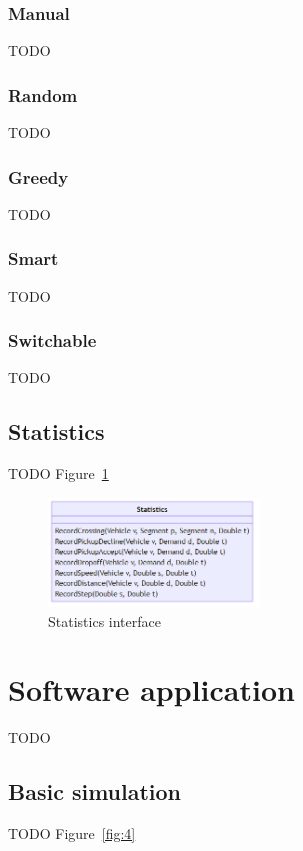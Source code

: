 \documentclass{article}
\begin{document}
    \subsubsection{Manual}
    TODO

    \subsubsection{Random}
    TODO
    
    \subsubsection{Greedy}
    TODO

    \subsubsection{Smart}
    TODO

    \subsubsection{Switchable}
    TODO

    \subsection{Statistics}
    \label{sec:statistics}
    TODO Figure~\ref{fig:3}

    \begin{figure}[htbp]
        \centering
        \includegraphics[width=0.5\textwidth]{../../diagrams/statistics/classes.png}
        \caption{Statistics interface}
        \label{fig:3}
    \end{figure}

    \section{Software application}
    \label{sec:app}
    TODO

    \subsection{Basic simulation}
    \label{sec:basic}
    TODO Figure~\ref{fig:4}
\end{document}
